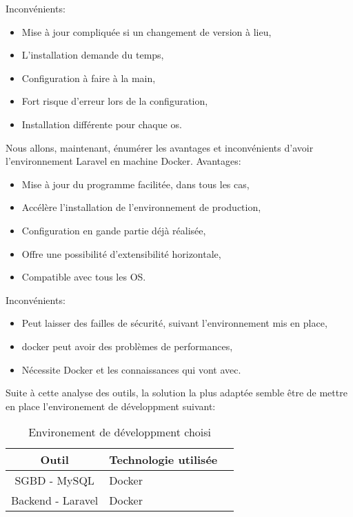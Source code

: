 \documentclass[
    iai, %
    il, %
]{heig-tb}
\begin{document}
Inconvénients:
\begin{itemize}
    \item Mise à jour compliquée si un changement de version à lieu,
    \item L'installation demande du temps,
    \item Configuration à faire à la main,
    \item Fort risque d'erreur lors de la configuration,
    \item Installation différente pour chaque \Gls{os}.
\end{itemize}

Nous allons, maintenant, énumérer les avantages et inconvénients d'avoir l'environnement Laravel en machine Docker.
Avantages:
\begin{itemize}
    \item Mise à jour du programme facilitée, dans tous les cas,
    \item Accélère l'installation de l'environnement de production,
    \item Configuration en gande partie déjà réalisée,
    \item Offre une possibilité d'extensibilité horizontale,
    \item Compatible avec tous les OS.
\end{itemize}

Inconvénients:
\begin{itemize}
    \item Peut laisser des failles de sécurité, suivant l'environnement mis en place,
    \item \Gls{docker} peut avoir des problèmes de performances, \cite{labrecque}
    \item Nécessite Docker et les connaissances qui vont avec. \cite{labrecque}
\end{itemize}




Suite à cette analyse des outils, la solution la plus adaptée semble être de mettre en place l'environement de développment suivant:

\begin{table}[h]
    \begin{center}
        \caption{Environement de développment choisi \label{env_prod}}
        \begin{tabular}{c|l|r}
            Outil             & Technologie utilisée \\ \hline
            SGBD - MySQL      & Docker               \\
            Backend - Laravel & Docker               \\
        \end{tabular}
    \end{center}
\end{table}
\end{document}

